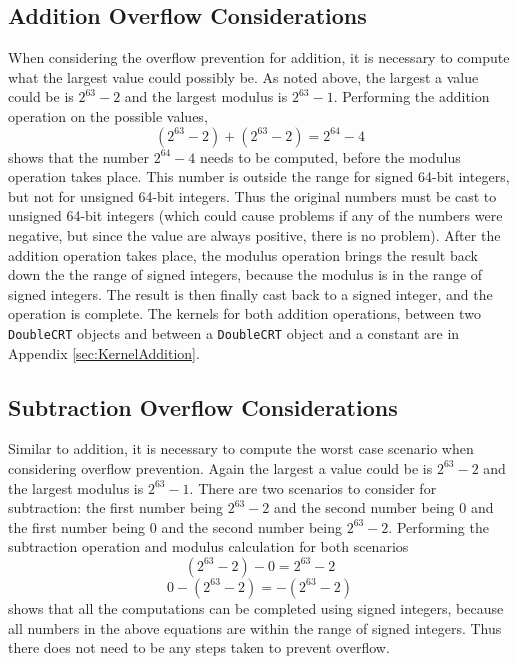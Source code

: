 \subsection{Addition Overflow Considerations}
When considering the overflow prevention for addition, it is necessary to compute what the largest value could possibly be. As noted above, the largest a value could be is $2^{63} - 2$ and the largest modulus is $2^{63} - 1$. Performing the addition operation on the possible values, 
\begin{equation} \label{eq:add}
(2^{63} - 2) + (2^{63} - 2) = 2^{64} - 4
\end{equation}
shows that the number $2^{64} - 4$ needs to be computed, before the modulus operation takes place. This number is outside the range for signed 64-bit integers, but not for unsigned 64-bit integers. Thus the original numbers must be cast to unsigned 64-bit integers (which could cause problems if any of the numbers were negative, but since the value are always positive, there is no problem). After the addition operation takes place, the modulus operation brings the result back down the the range of signed integers, because the modulus is in the range of signed integers. The result is then finally cast back to a signed integer, and the operation is complete. The kernels for both addition operations, between two \verb|DoubleCRT| objects and between a \verb|DoubleCRT| object and a constant are in Appendix 
\ref{sec:KernelAddition}.

\subsection{Subtraction Overflow Considerations}
Similar to addition, it is necessary to compute the worst case scenario when considering overflow prevention. Again the largest a value could be is $2^{63} - 2$ and the largest modulus is $2^{63} - 1$. There are two scenarios to consider for subtraction: the first number being $2^{63} - 2$ and the second number being 0 and the first number being 0 and the second number being $2^{63} - 2$. Performing the subtraction operation and modulus calculation for both scenarios
\begin{equation} \label{eq:sub1}
(2^{63} - 2) - 0 = 2^{63} - 2
\end{equation}
\begin{equation} \label{eq:sub2}
0 - (2^{63} - 2) = -(2^{63} - 2)
\end{equation}
shows that all the computations can be completed using signed integers, because all numbers in the above equations are within the range of signed integers. Thus there does not need to be any steps taken to prevent overflow. 

